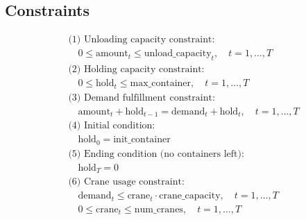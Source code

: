 \documentclass{article}
\begin{document}
\subsection*{Constraints}
\begin{align*}
    & \text{(1) Unloading capacity constraint:} \\
    & \quad 0 \leq \text{amount}_t \leq \text{unload\_capacity}_t, \quad t = 1, \ldots, T \\
    & \text{(2) Holding capacity constraint:} \\
    & \quad 0 \leq \text{hold}_t \leq \text{max\_container}, \quad t = 1, \ldots, T \\
    & \text{(3) Demand fulfillment constraint:} \\
    & \quad \text{amount}_t + \text{hold}_{t-1} = \text{demand}_t + \text{hold}_t, \quad t = 1, \ldots, T \\
    & \text{(4) Initial condition:} \\
    & \quad \text{hold}_0 = \text{init\_container} \\
    & \text{(5) Ending condition (no containers left):} \\
    & \quad \text{hold}_T = 0 \\
    & \text{(6) Crane usage constraint:} \\
    & \quad \text{demand}_t \leq \text{crane}_t \cdot \text{crane\_capacity}, \quad t = 1, \ldots, T \\
    & \quad 0 \leq \text{crane}_t \leq \text{num\_cranes}, \quad t = 1, \ldots, T \\
\end{align*}
\end{document}
